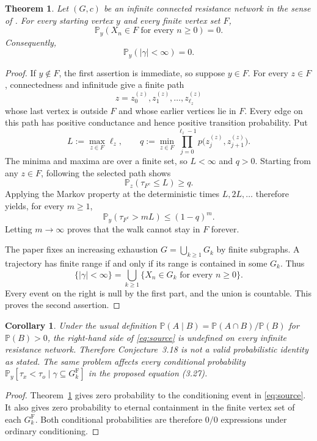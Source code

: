 \documentclass[11pt]{article}
\newtheorem{theorem}{Theorem}
\newtheorem{corollary}{Corollary}
\newcommand{\PP}{\mathbb P}
\begin{document}
\begin{theorem}\label{thm:null}
Let $(G,c)$ be an infinite connected resistance network in the sense of
\cite{JP}.  For every starting vertex $y$ and every finite vertex set $F$,
\[
 \PP_y(X_n\in F\text{ for every }n\geq0)=0.
\]
Consequently,
\[
 \PP_y(|\gamma|<\infty)=0.
\]
\end{theorem}

\begin{proof}
If $y\notin F$, the first assertion is immediate, so suppose $y\in F$.
For every $z\in F$, connectedness and infinitude give a finite path
\[
 z=z^{(z)}_0,z^{(z)}_1,\ldots,z^{(z)}_{\ell_z}
\]
whose last vertex is outside $F$ and whose earlier vertices lie in $F$.
Every edge on this path has positive conductance and hence positive
transition probability.  Put
\[
 L:=\max_{z\in F}\ell_z,
 \qquad
 q:=\min_{z\in F}\prod_{j=0}^{\ell_z-1}
 p\bigl(z^{(z)}_j,z^{(z)}_{j+1}\bigr).
\]
The minima and maxima are over a finite set, so $L<\infty$ and $q>0$.
Starting from any $z\in F$, following the selected path shows
\[
 \PP_z(\tau_{F^c}\leq L)\geq q.
\]
Applying the Markov property at the deterministic times $L,2L,\ldots$
therefore yields, for every $m\geq1$,
\[
 \PP_y(\tau_{F^c}>mL)\leq(1-q)^m.
\]
Letting $m\to\infty$ proves that the walk cannot stay in $F$ forever.

The paper fixes an increasing exhaustion $G=\bigcup_{k\geq1}G_k$ by finite
subgraphs.  A trajectory has finite range if and only if its range is
contained in some $G_k$.  Thus
\[
 \{|\gamma|<\infty\}
 =\bigcup_{k\geq1}\{X_n\in G_k\text{ for every }n\geq0\}.
\]
Every event on the right is null by the first part, and the union is
countable.  This proves the second assertion.
\end{proof}

\begin{corollary}\label{cor:resolution}
Under the usual definition
$\PP(A\mid B)=\PP(A\cap B)/\PP(B)$ for $\PP(B)>0$, the right-hand side of
\eqref{eq:source} is undefined on every infinite resistance network.
Therefore Conjecture~3.18 is not a valid probabilistic identity as stated.
The same problem affects every conditional probability
$\PP_y[\tau_x<\tau_o\mid\gamma\subseteq G_k^{\mathrm F}]$ in the proposed
equation (3.27).
\end{corollary}

\begin{proof}
Theorem~\ref{thm:null} gives zero probability to the conditioning event in
\eqref{eq:source}.  It also gives zero probability to eternal containment in
the finite vertex set of each $G_k^{\mathrm F}$.  Both conditional
probabilities are therefore $0/0$ expressions under ordinary conditioning.
\end{proof}
\end{document}
